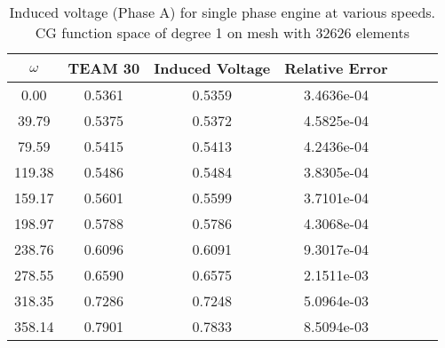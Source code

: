 \begin{table}[!ht]
\centering
\caption{Induced voltage (Phase A) for single phase engine at various speeds. CG function space of degree 1 on mesh with 32626 elements}
\label{tab:voltage:single}
\begin{tabular}{ccccccc}
\toprule
$\omega$ & TEAM 30 & Induced Voltage & Relative Error \\
\midrule
    0.00 &  0.5361 &          0.5359 &     3.4636e-04 \\
   39.79 &  0.5375 &          0.5372 &     4.5825e-04 \\
   79.59 &  0.5415 &          0.5413 &     4.2436e-04 \\
  119.38 &  0.5486 &          0.5484 &     3.8305e-04 \\
  159.17 &  0.5601 &          0.5599 &     3.7101e-04 \\
  198.97 &  0.5788 &          0.5786 &     4.3068e-04 \\
  238.76 &  0.6096 &          0.6091 &     9.3017e-04 \\
  278.55 &  0.6590 &          0.6575 &     2.1511e-03 \\
  318.35 &  0.7286 &          0.7248 &     5.0964e-03 \\
  358.14 &  0.7901 &          0.7833 &     8.5094e-03 \\
\bottomrule
\end{tabular}
\end{table}